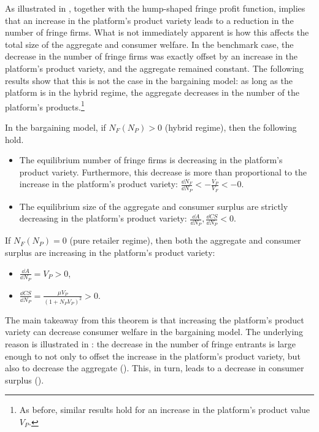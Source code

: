 As illustrated in , together with the hump-shaped fringe profit function,  implies that an increase in the platform's product variety leads to a reduction in the number of fringe firms.
What is not immediately apparent is how this affects the total size of the aggregate and consumer welfare.
In the benchmark case, the decrease in the number of fringe firms was exactly offset by an increase in the platform's product variety, and the aggregate remained constant.
The following results show that this is not the case in the bargaining model: as long as the platform is in the hybrid regime, the aggregate decreases in the number of the platform's products.\footnote{
    As before, similar results hold for an increase in the platform's product value $V_P$.
}

\begin{theorem}
    \label{prop:equilibrium_bargaining}
    In the bargaining model, if $N_F(N_P) > 0$ (hybrid regime), then the following hold.
    \begin{itemize}
        \item The equilibrium number of fringe firms is decreasing in the platform's product variety. Furthermore, this decrease is more than proportional to the increase in the platform's product variety: $\frac{\dd N_F}{\dd N_P} < -\frac{V_P}{V_F} < -0$.
        \item The equilibrium size of the aggregate and consumer surplus are strictly decreasing in the platform's product variety: $\frac{\dd A}{\dd N_P}, \frac{\dd CS}{\dd N_P} < 0$.
    \end{itemize}
    If $N_F(N_P) = 0$ (pure retailer regime), then both the aggregate and consumer surplus are increasing in the platform's product variety:
    \begin{itemize}
        \item $\frac{\dd A}{\dd N_P} = V_P > 0$,
        \item $\frac{\dd CS}{\dd N_P} = \frac{\mu V_P}{(1 + N_P V_P)^2} > 0$.
    \end{itemize}
\end{theorem}

The main takeaway from this theorem is that increasing the platform's product variety can decrease consumer welfare in the bargaining model.
The underlying reason is illustrated in : the decrease in the number of fringe entrants is large enough to not only to offset the increase in the platform's product variety, but also to decrease the aggregate ().
This, in turn, leads to a decrease in consumer surplus ().

